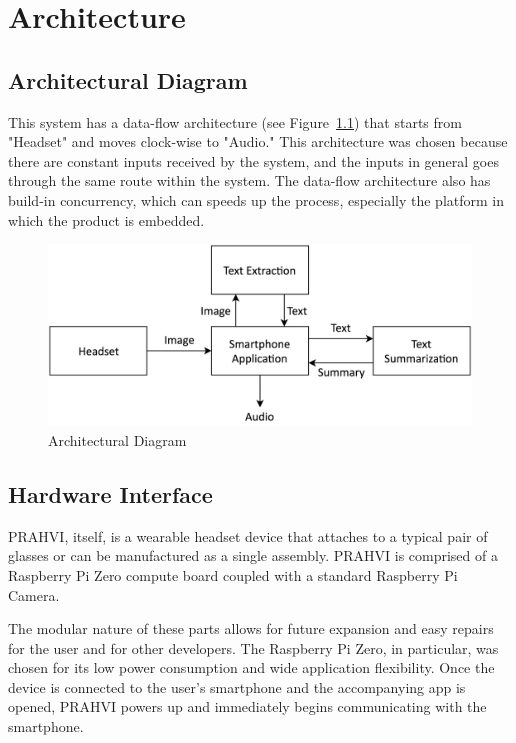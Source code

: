 \chapter{Architecture}
\section{Architectural Diagram}
This system has a data-flow architecture (see Figure~\ref{architectualDiagram}) that starts from "Headset" and moves clock-wise to "Audio." This architecture was chosen because there are constant inputs received by the system, and the inputs in general goes through the same route within the system. The data-flow architecture also has build-in concurrency, which can speeds up the process, especially the platform in which the product is embedded.
\begin{figure}
	\centering
    \includegraphics[scale = 0.2]{ArchitectureDiagram.png}
    
    \caption{Architectural Diagram}
	\label{architectualDiagram}
\end{figure}

\section{Hardware Interface}
PRAHVI, itself, is a wearable headset device that attaches to a typical pair of glasses or can be manufactured as a single assembly. PRAHVI is comprised of a Raspberry Pi Zero compute board coupled with a standard Raspberry Pi Camera.

The modular nature of these parts allows for future expansion and easy repairs for the user and for other developers. The Raspberry Pi Zero, in particular, was chosen for its low power consumption and wide application flexibility. Once the device is connected to the user's smartphone and the accompanying app is opened, PRAHVI powers up and immediately begins communicating with the smartphone.

